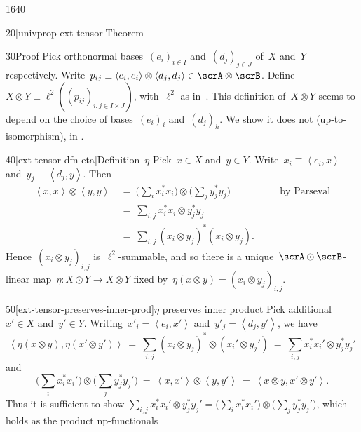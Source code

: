 \begin{parsec}{1640}
\begin{point}{20}[univprop-ext-tensor]{Theorem}
\begin{enumerate}
\end{enumerate}
\spacingfix{}
\begin{point}{30}{Proof}%
Pick orthonormal bases~$(e_i)_{i \in I}$ and~$(d_j)_{j \in J}$ of~$X$
    and~$Y$ respectively.
Write~$p_{ij} \equiv \left<e_i, e_i\right>\otimes \left<d_j,d_j\right>
    \in \scrA \otimes \scrB$.
Define~$X \otimes Y \equiv \ell^2((p_{ij})_{i,j \in I\times J})$,
    with~$\ell^2$ as in~.
This definition of~$X \otimes Y$ seems to depend
    on the choice of bases~$(e_i)_i$ and~$(d_j)_h$.
    We show it does not (up-to-isomorphism), in .
\begin{point}{40}[ext-tensor-dfn-eta]{Definition~$\eta$}%
Pick~$x \in X$ and~$y \in Y$.
Write~$x_i \equiv \left<e_i, x\right>$
and~$y_j \equiv \left<d_j, y\right>$.
Then
\begin{align*}
    \left<x,x\right> \otimes \left<y,y\right>
    &\ = \ \bigl( \sum_i x_i^*x_i\bigr) \otimes\bigl(\sum_jy_j^*y_j\bigr)
            &\quad&\text{by Parseval}  \\
            &\ = \ \sum_{i,j}  x_i^*x_i  \otimes y_j^*y_j \\
            &\ = \ \sum_{i,j}  (x_i \otimes y_j)^* (x_i  \otimes y_j).
\end{align*}
Hence~$(x_i \otimes y_j)_{i,j}$ is~$\ell^2$-summable,
    and so there is a unique~$\scrA \odot\scrB$-linear
    map~$\eta\colon X \odot Y \to X \otimes Y$ fixed
    by~$\eta(x \otimes y) = (x_i \otimes y_j)_{i,j}$.
\end{point}
\begin{point}{50}[ext-tensor-preserves-inner-prod]{$\eta$ preserves inner product}%
Pick additional~$x' \in X$ and~$y' \in Y$.
Writing~$x'_i = \left<e_i,x'\right>$
    and~$y'_j = \left<d_j, y'\right>$,
we have
\begin{equation*}
    \left<\eta(x\otimes y), \eta(x' \otimes y')\right>
    \ = \ \sum_{i,j} (x_i\otimes y_j)^* \otimes (x_i' \otimes y_j')
    \ = \ \sum_{i,j} x_i^*x_i' \otimes y_j^* y_j'
\end{equation*}
and
\begin{equation*}
    \bigl(\sum_i x_i^*x_i'\bigr) \otimes \bigl( \sum_j y_j^* y_j' \bigr)
    \ = \ \left<x,x'\right> \otimes \left<y,y'\right>
    \ = \ \left<x\otimes y,x' \otimes y'\right> .
\end{equation*}
Thus it is sufficient to show
    $\sum_{i,j} x_i^*x_i' \otimes y_j^* y_j'
    = \bigl(\sum_i x_i^*x_i'\bigr) \otimes \bigl( \sum_j y_j^* y_j' \bigr)$,
    which holds as the product np-functionals

\end{point}
\end{point}
\end{point}
\end{parsec}
